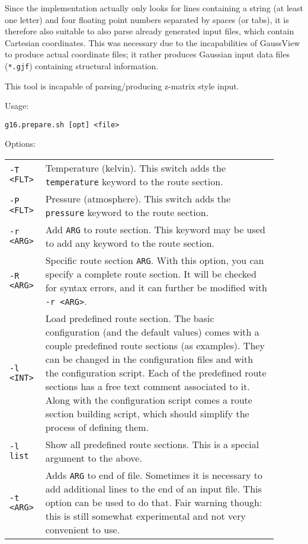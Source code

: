 \documentclass[   %
  final,          %
  a4paper         %
]{article}
\begin{document}
Since the implementation actually only looks for lines containing a string (at least one letter)
and four floating point numbers separated by spaces (or tabs),
it is therefore also suitable to also parse already generated input files,
which contain Cartesian coordinates.
This was necessary due to the incapabilities of GaussView to produce
actual coordinate files; it rather produces Gaussian input data files (\texttt{*.gjf}) 
containing structural information.

This tool is incapable of parsing/producing z-matrix style input.

Usage: 

\lstinline`g16.prepare.sh [opt] <file>`

Options:

\begin{longtable}{p{0.1\linewidth}p{0.8\linewidth}}
  {\lstinline`-T <FLT>`} & Temperature (kelvin). This switch adds the \texttt{temperature} keyword to the route section. \\
  {\lstinline`-P <FLT>`} & Pressure (atmosphere). This switch adds the \texttt{pressure} keyword to the route section. \\
  {\lstinline`-r <ARG>`} & Add {\lstinline`ARG`} to route section. This keyword may be used to add any keyword to the route section. \\
  {\lstinline`-R <ARG>`} & Specific route section {\lstinline`ARG`}. 
    With this option, you can specify a complete route section. 
    It will be checked for syntax errors, and it can further be modified with {\lstinline`-r <ARG>`}. \\
  {\lstinline`-l <INT>`} & Load predefined route section. 
    The basic configuration (and the default values) comes with a couple predefined route sections (as examples).
    They can be changed in the configuration files and with the configuration script. 
    Each of the predefined route sections has a free text comment associated to it.
    Along with the configuration script comes a route section building script, which should simplify the process of defining them. \\
  {\lstinline`-l list `} & Show all predefined route sections. This is a special argument to the above. \\
  {\lstinline`-t <ARG>`} & Adds {\lstinline`ARG`} to end of file. 
    Sometimes it is necessary to add additional lines to the end of an input file.
    This option can be used to do that. Fair warning though: this is still somewhat experimental
    and not very convenient to use.

\end{longtable}
\end{document}
